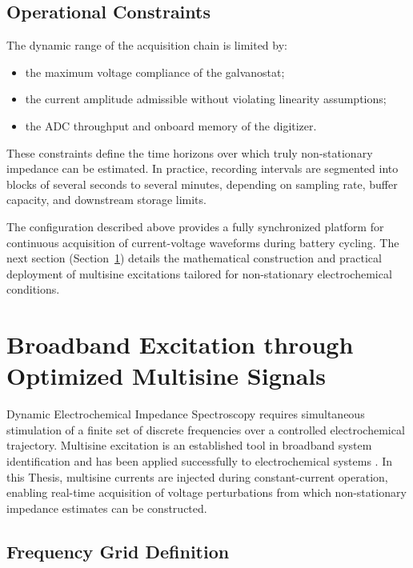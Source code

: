 \subsection{Operational Constraints}

The dynamic range of the acquisition chain is limited by:
\begin{itemize}
    \item the maximum voltage compliance of the galvanostat;
    \item the current amplitude admissible without violating linearity assumptions;
    \item the ADC throughput and onboard memory of the digitizer.
\end{itemize}
These constraints define the time horizons over which truly non-stationary impedance can be estimated. In practice, recording intervals are segmented into blocks of several seconds to several minutes, depending on sampling rate, buffer capacity, and downstream storage limits.

The configuration described above provides a fully synchronized platform for continuous acquisition of current-voltage waveforms during battery cycling. The next section (Section~\ref{sec:multisine}) details the mathematical construction and practical deployment of multisine excitations tailored for non-stationary electrochemical conditions.

\section{Broadband Excitation through Optimized Multisine Signals}
\label{sec:multisine}

Dynamic Electrochemical Impedance Spectroscopy requires simultaneous stimulation of a finite set of discrete frequencies over a controlled electrochemical trajectory. Multisine excitation is an established tool in broadband system identification \cite{} and has been applied successfully to electrochemical systems \cite{}. In this Thesis, multisine currents are injected during constant-current operation, enabling real-time acquisition of voltage perturbations from which non-stationary impedance estimates can be constructed.

\subsection{Frequency Grid Definition}

